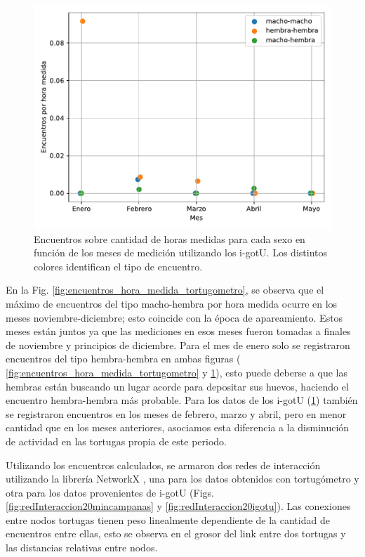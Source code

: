 \begin{figure}[ht]
    \begin{center}
       
   
    \includegraphics[width=\imsize]{Chap2/encuentros_por_hora_igotu.pdf}
\end{center}
    \caption[Encuentros por hora medida tomando los datos de los i-gotU.]{Encuentros sobre cantidad de horas medidas para cada sexo en función de los meses de medición utilizando los i-gotU. Los distintos colores identifican el tipo de encuentro.}
    \label{fig:encuentros_hora_medida_igotu}
\end{figure}
En la Fig. \ref{fig:encuentros_hora_medida_tortugometro}, se observa que el máximo de encuentros del tipo macho-hembra por hora medida ocurre en los meses noviembre-diciembre; esto coincide con la época de apareamiento. Estos meses están juntos ya que las mediciones en esos meses fueron tomadas a finales de noviembre y principios de diciembre. Para el mes de enero solo se registraron encuentros del tipo hembra-hembra en ambas figuras ( \ref{fig:encuentros_hora_medida_tortugometro} y \ref{fig:encuentros_hora_medida_igotu}), esto puede deberse a que las hembras están buscando un lugar acorde para depositar sus huevos, haciendo el encuentro hembra-hembra más probable. Para los datos de los i-gotU (\ref{fig:encuentros_hora_medida_igotu}) también se registraron encuentros en los meses de febrero, marzo y abril, pero en menor cantidad que en los meses anteriores, asociamos esta diferencia a la disminución de actividad en las tortugas propia de este periodo.
 
 
Utilizando los encuentros calculados, se armaron dos redes de interacción  utilizando la librería NetworkX \cite{networkx}, una para los datos obtenidos con  tortugómetro y otra para los datos provenientes de i-gotU (Figs. \ref{fig:redInteraccion20mincampanas} y \ref{fig:redInteraccion20igotu}). Las conexiones entre nodos tortugas tienen peso linealmente dependiente de la cantidad de encuentros entre ellas, esto se observa en el grosor del link entre dos tortugas y las distancias relativas entre nodos.
 
